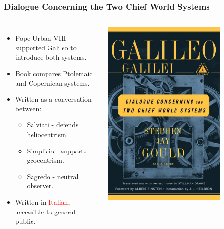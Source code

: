 \documentclass[aspectratio=1611, 9pt]{beamer}
\begin{document}
\begin{frame}
  \frametitle{Dialogue Concerning the Two Chief World Systems}
  \begin{columns}
    \begin{itemize}
      \item Pope Urban VIII supported Galileo to introduce both systems.
      \item Book compares Ptolemaic and Copernican systems.
      \item Written as a conversation between:
      \begin{itemize}
        \item Salviati - defends heliocentrism.
        \item Simplicio - supports geocentrism.
        \item Sagredo - neutral observer.
      \end{itemize}
      \item Written in \textcolor{red}{Italian}, accessible to general public.
    \end{itemize}

    \begin{center}
      \includegraphics[width=0.8\textwidth]{pictures/dialogue.jpg}
    \end{center}
  \end{columns}
\end{frame}
\end{document}
